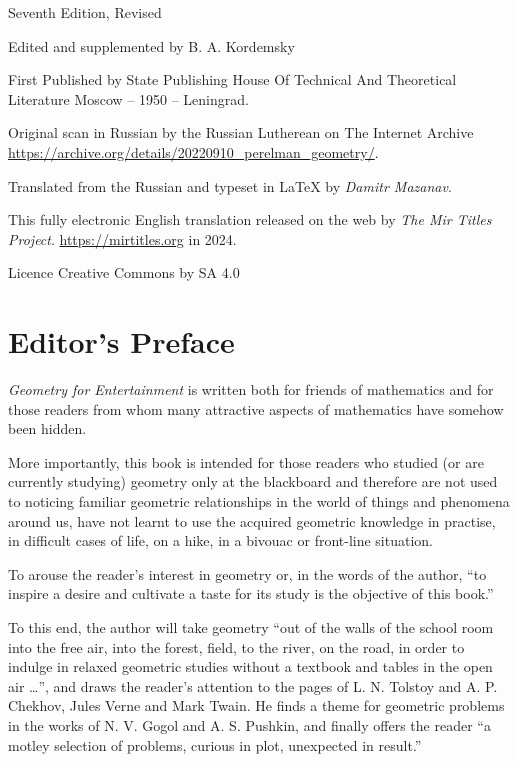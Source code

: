 {\noindent
Seventh Edition, Revised

Edited and supplemented by B. A. Kordemsky

First Published by State Publishing House Of Technical And Theoretical Literature Moscow -- 1950 -- Leningrad.

Original scan in Russian by the Russian Lutherean on The Internet Archive \url{https://archive.org/details/20220910_perelman_geometry/}.

Translated from the Russian and typeset in \LaTeX{} by \emph{Damitr Mazanav}.

This fully electronic English translation released on the web by \emph{The Mir Titles Project}. \url{https://mirtitles.org} in 2024.

 


Licence Creative Commons by SA 4.0

\cleardoublepage

 \tableofcontents
 
 \cleardoublepage

\chapter{Editor's Preface}
\label{editor-preface}


\emph{Geometry for Entertainment} is written both for friends of mathematics and for those readers from whom many attractive aspects of mathematics have somehow been hidden.

More importantly, this book is intended for those readers who studied (or are currently studying) geometry only at the blackboard and therefore are not used to noticing familiar geometric relationships in the world of things and phenomena around us, have not learnt to use the acquired geometric knowledge in practise, in difficult cases of life, on a hike, in a bivouac or front-line situation.

To arouse the reader's interest in geometry or, in the words of the author, ``to inspire a desire and cultivate a taste for its study is the objective of this book.''

To this end, the author will take geometry ``out of the walls of the school room into the free air, into the forest, field, to the river, on the road, in order to indulge in relaxed geometric studies without a textbook and tables in the open air \ldots{}'', and draws the reader's attention to the pages of L. N. Tolstoy and A. P. Chekhov, Jules Verne and Mark Twain. He finds a theme for geometric problems in the works of N. V. Gogol and A. S. Pushkin, and finally offers the reader ``a motley selection of problems, curious in plot, unexpected in result.''

}
